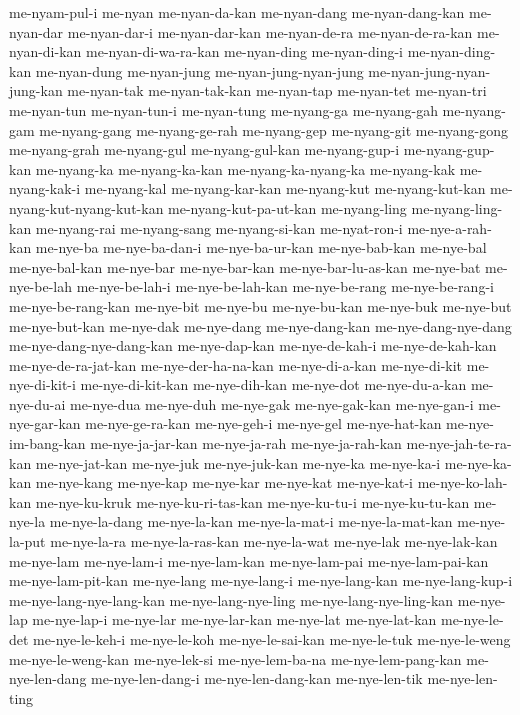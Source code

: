 {me-nyam-pul-i me-nyan me-nyan-da-kan me-nyan-dang me-nyan-dang-kan
me-nyan-dar me-nyan-dar-i me-nyan-dar-kan me-nyan-de-ra me-nyan-de-ra-kan
me-nyan-di-kan me-nyan-di-wa-ra-kan me-nyan-ding me-nyan-ding-i
me-nyan-ding-kan me-nyan-dung me-nyan-jung me-nyan-jung-nyan-jung
me-nyan-jung-nyan-jung-kan me-nyan-tak me-nyan-tak-kan me-nyan-tap
me-nyan-tet me-nyan-tri me-nyan-tun me-nyan-tun-i me-nyan-tung me-nyang-ga
me-nyang-gah me-nyang-gam me-nyang-gang me-nyang-ge-rah me-nyang-gep
me-nyang-git me-nyang-gong me-nyang-grah me-nyang-gul me-nyang-gul-kan
me-nyang-gup-i me-nyang-gup-kan me-nyang-ka me-nyang-ka-kan
me-nyang-ka-nyang-ka me-nyang-kak me-nyang-kak-i me-nyang-kal
me-nyang-kar-kan me-nyang-kut me-nyang-kut-kan me-nyang-kut-nyang-kut-kan
me-nyang-kut-pa-ut-kan me-nyang-ling me-nyang-ling-kan me-nyang-rai
me-nyang-sang me-nyang-si-kan me-nyat-ron-i me-nye-a-rah-kan me-nye-ba
me-nye-ba-dan-i me-nye-ba-ur-kan me-nye-bab-kan me-nye-bal me-nye-bal-kan
me-nye-bar me-nye-bar-kan me-nye-bar-lu-as-kan me-nye-bat me-nye-be-lah
me-nye-be-lah-i me-nye-be-lah-kan me-nye-be-rang me-nye-be-rang-i
me-nye-be-rang-kan me-nye-bit me-nye-bu me-nye-bu-kan me-nye-buk
me-nye-but me-nye-but-kan me-nye-dak me-nye-dang me-nye-dang-kan
me-nye-dang-nye-dang me-nye-dang-nye-dang-kan me-nye-dap-kan
me-nye-de-kah-i me-nye-de-kah-kan me-nye-de-ra-jat-kan
me-nye-der-ha-na-kan me-nye-di-a-kan me-nye-di-kit me-nye-di-kit-i
me-nye-di-kit-kan me-nye-dih-kan me-nye-dot me-nye-du-a-kan me-nye-du-ai
me-nye-dua me-nye-duh me-nye-gak me-nye-gak-kan me-nye-gan-i
me-nye-gar-kan me-nye-ge-ra-kan me-nye-geh-i me-nye-gel me-nye-hat-kan
me-nye-im-bang-kan me-nye-ja-jar-kan me-nye-ja-rah me-nye-ja-rah-kan
me-nye-jah-te-ra-kan me-nye-jat-kan me-nye-juk me-nye-juk-kan me-nye-ka
me-nye-ka-i me-nye-ka-kan me-nye-kang me-nye-kap me-nye-kar me-nye-kat
me-nye-kat-i me-nye-ko-lah-kan me-nye-ku-kruk me-nye-ku-ri-tas-kan
me-nye-ku-tu-i me-nye-ku-tu-kan me-nye-la me-nye-la-dang me-nye-la-kan
me-nye-la-mat-i me-nye-la-mat-kan me-nye-la-put me-nye-la-ra
me-nye-la-ras-kan me-nye-la-wat me-nye-lak me-nye-lak-kan me-nye-lam
me-nye-lam-i me-nye-lam-kan me-nye-lam-pai me-nye-lam-pai-kan
me-nye-lam-pit-kan me-nye-lang me-nye-lang-i me-nye-lang-kan
me-nye-lang-kup-i me-nye-lang-nye-lang-kan me-nye-lang-nye-ling
me-nye-lang-nye-ling-kan me-nye-lap me-nye-lap-i me-nye-lar me-nye-lar-kan
me-nye-lat me-nye-lat-kan me-nye-le-det me-nye-le-keh-i me-nye-le-koh
me-nye-le-sai-kan me-nye-le-tuk me-nye-le-weng me-nye-le-weng-kan
me-nye-lek-si me-nye-lem-ba-na me-nye-lem-pang-kan me-nye-len-dang
me-nye-len-dang-i me-nye-len-dang-kan me-nye-len-tik me-nye-len-ting
}
